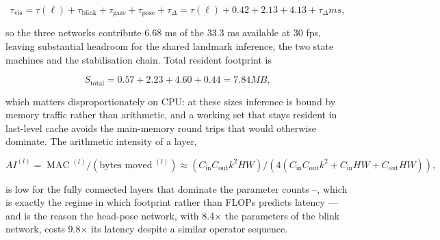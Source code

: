 \begin{equation}
\label{eq:165}
\tau _{\mathrm{vis}} = \tau (\ell ) + \tau _{\mathrm{blink}} + \tau _{\mathrm{gaze}} + \tau _{\mathrm{pose}} + \tau _{\Delta} = \tau (\ell ) + 0.42 + 2.13 + 4.13 + \tau _{\Delta} ms ,
\end{equation}

so the three networks contribute 6.68 ms of the 33.3 ms available at 30 fps, leaving substantial headroom for the shared landmark inference, the two state machines and the stabilisation chain. Total resident footprint is

\begin{equation}
\label{eq:166}
S_{\mathrm{total}} = 0.57 + 2.23 + 4.60 + 0.44 = 7.84 MB ,
\end{equation}

which matters disproportionately on CPU: at these sizes inference is bound by memory traffic rather than arithmetic, and a working set that stays resident in last-level cache avoids the main-memory round trips that would otherwise dominate. The arithmetic intensity of a layer,

\begin{equation}
\label{eq:167}
AI^{(l)} = \;\text{MAC}\;^{(l)} / ( \text{bytes moved}\;^{(l)} ) \approx ( C_{\mathrm{in}} C_{\mathrm{out}} k^{2} H W ) / ( 4 ( C_{\mathrm{in}} C_{\mathrm{out}} k^{2} + C_{\mathrm{in}} H W + C_{\mathrm{out}} H W ) ) ,
\end{equation}

is low for the fully connected layers that dominate the parameter counts --, which is exactly the regime in which footprint rather than FLOPs predicts latency --- and is the reason the head-pose network, with 8.4$\times$ the parameters of the blink network, costs 9.8$\times$ its latency despite a similar operator sequence.
